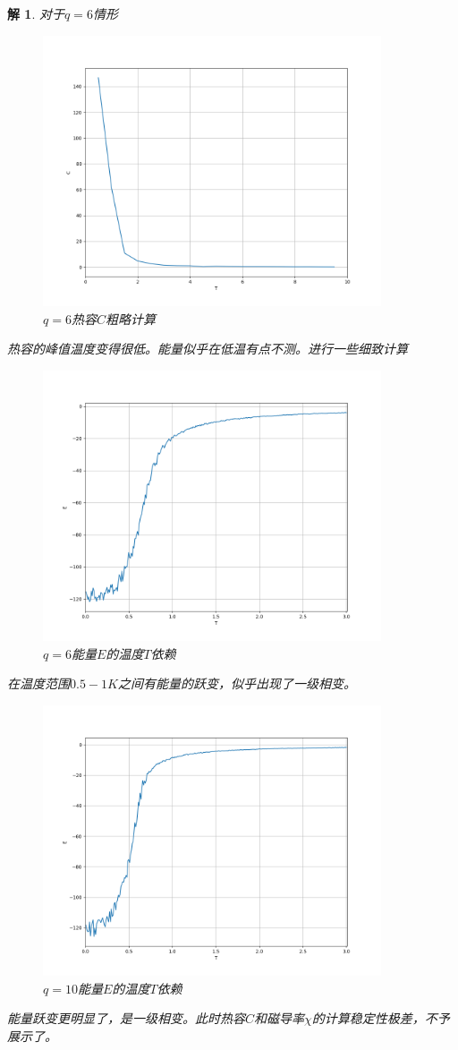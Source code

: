 \documentclass[10pt]{ctexart}
\newtheorem*{solution}{解}
\begin{document}
\begin{solution}
    对于$q=6$情形
    \begin{figure}[H]
        \centering
        \includegraphics[width=10cm]{q6_rough.png}
        \caption{$q=6$热容$C$粗略计算}
    \end{figure}
    热容的峰值温度变得很低。能量似乎在低温有点不测。进行一些细致计算
    \begin{figure}[H]
        \centering
        \includegraphics[width=10cm]{q6_E.png}
        \caption{$q=6$能量$E$的温度$T$依赖}
    \end{figure}
    在温度范围$0.5-1K$之间有能量的跃变，似乎出现了一级相变。
    \begin{figure}[H]
        \centering
        \includegraphics[width=10cm]{q10_E.png}
        \caption{$q=10$能量$E$的温度$T$依赖}
    \end{figure}
    能量跃变更明显了，是一级相变。此时热容$C$和磁导率$\chi$的计算稳定性极差，不予展示了。
\end{solution}
\end{document}
